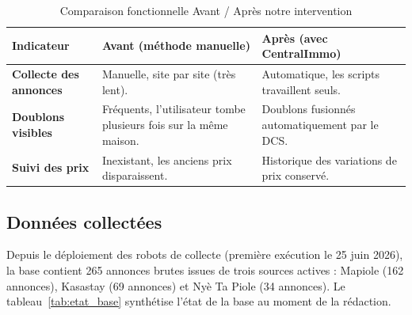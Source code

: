 \begin{table}[H]
    \centering
    \small
    \renewcommand{\arraystretch}{1.4}
    \begin{tabular}{|p{3.5cm}|p{5cm}|p{5cm}|}
        \hline
        \rowcolor{headergray}
        \textbf{Indicateur} & \textbf{Avant (m\'ethode manuelle)} & \textbf{Apr\`es (avec CentralImmo)} \\ \hline
        \textbf{Collecte des annonces} & Manuelle, site par site (tr\`es lent). & Automatique, les scripts travaillent seuls. \\ \hline
        \textbf{Doublons visibles} & Fr\'equents, l'utilisateur tombe plusieurs fois sur la m\^eme maison. & Doublons fusionn\'es automatiquement par le DCS. \\ \hline
        \textbf{Suivi des prix} & Inexistant, les anciens prix disparaissent. & Historique des variations de prix conserv\'e. \\ \hline
    \end{tabular}
    \caption{Comparaison fonctionnelle Avant / Apr\`es notre intervention}
    \label{tab:avant_apres}
\end{table}

\subsection{Donn\'ees collect\'ees}
Depuis le d\'eploiement des robots de collecte (premi\`ere ex\'ecution le 25 juin 2026), la base contient 265 annonces brutes issues de trois sources actives : Mapiole (162 annonces), Kasastay (69 annonces) et Ny\`e Ta Piole (34 annonces). Le tableau~\ref{tab:etat_base} synth\'etise l'\'etat de la base au moment de la r\'edaction.


